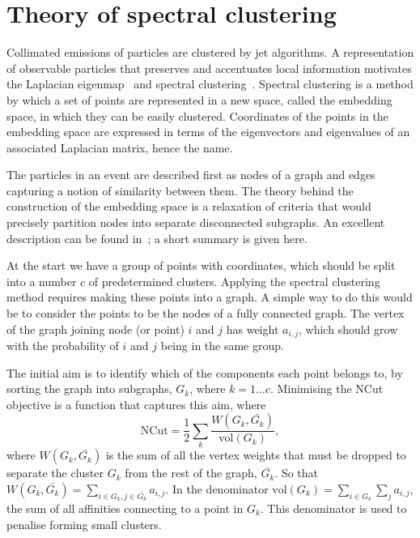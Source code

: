 \section{Theory of spectral clustering}\label{sec:spectral_theory}

Collimated emissions of particles are clustered by jet algorithms.  A
representation of observable particles that preserves and accentuates local information
motivates the Laplacian eigenmap~\cite{BelkinNiyogi2003} and spectral
clustering~\cite{NgJordanWeiss2002}.
Spectral clustering is a method by which a set of points are represented in a new space,
called the embedding space, in which they can be easily clustered.  Coordinates of the
points in the embedding space are expressed in terms of the eigenvectors and eigenvalues
of an associated Laplacian matrix, hence the name.

The particles in an event are described first as nodes of a graph and
edges capturing a notion of similarity between them.
The theory behind the
construction of the embedding space is a relaxation of criteria that would precisely
partition nodes into separate disconnected subgraphs.
An excellent description can be found in~\cite{luxburg2007spectraltutorial}; a short
summary is given here.

At the start we have a group of points with coordinates, which should be split into a  number \(c\) of predetermined clusters.
Applying the spectral clustering method requires making these points into a graph.
A simple way to do this would be to consider the points to be the nodes of a fully connected graph.
The vertex of the graph joining node (or point) \(i\) and \(j\) has weight \(a_{i, j}\),
which should grow with the probability of \(i\) and \(j\) being in the same group.

The initial aim is to identify which of the components each point belongs to,
by sorting the graph into subgraphs, \(G_k\), where \(k=1 \dots c\).
Minimising the NCut objective is a function that captures this aim, where 
\begin{equation}
    \text{NCut} = \frac{1}{2}\sum_k\frac{W(G_k, \bar{G_k})}{\text{vol}(G_k)},
\end{equation}\label{eqn:cost_function}
where \(W(G_k, \bar{G_k})\) is the sum of all the vertex weights that must be dropped
to separate the cluster \(G_k\) from the rest of the graph, \(\bar{G_k}\).
So that \( W(G_k, \bar{G_k}) = \sum_{i \in G_k, j \in \bar{G_k}} a_{i, j} \).
In the denominator \(\text{vol}(G_k) = \sum_{i \in G_k} \sum_{j} a_{i, j}\),
the sum of all affinities connecting to a point in \(G_k\).
This denominator is used to penalise forming small clusters.

